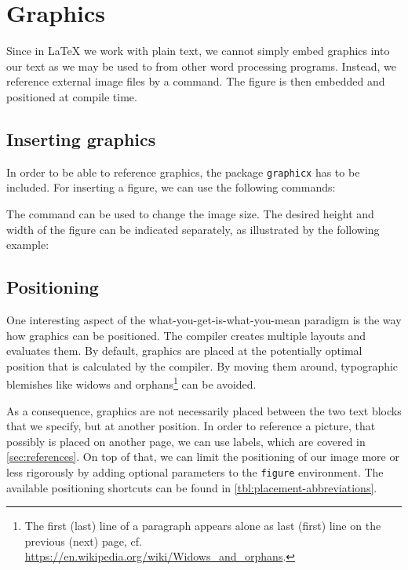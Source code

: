 \chapter{Graphics}
\label{sec:graphics}

Since in \LaTeX{} we work with plain text, we cannot simply embed graphics into our text as we may be used to from other word processing programs. 
Instead, we reference external image files by a command. The figure is then embedded and positioned at compile time.

\section{Inserting graphics}
\label{sec:display-graphics}
In order to be able to reference graphics, the package \texttt{graphicx} has to be included. For inserting a figure, we can use the following commands:


\noindent The command  can be used to change the image size. The desired height and width of the figure can be indicated separately, as illustrated by the following example:


\section{Positioning}
\label{sec:graphics-placement}
One interesting aspect of the  what-you-get-is-what-you-mean paradigm is the way how graphics can be positioned. 
The compiler creates multiple layouts and evaluates them. 
By default, graphics are placed at the potentially optimal position that is calculated by the compiler.
By moving them around, typographic blemishes like widows and orphans\footnote{The first (last) line of a paragraph appears alone as last (first) line on the previous (next) page, cf. \url{https://en.wikipedia.org/wiki/Widows_and_orphans}.} can be avoided. 

As a consequence, graphics are not necessarily placed between the two text blocks that we specify, but at another position. 
In order to reference a picture, that possibly is placed on another page, we can use labels, which are covered in \cref{sec:references}. 
On top of that, we can limit the positioning of our image more or less rigorously by adding optional parameters to the \texttt{figure} environment. The available positioning shortcuts can be found in \cref{tbl:placement-abbreviations}.

